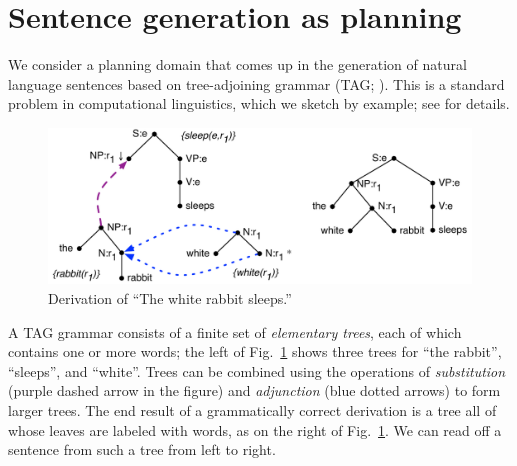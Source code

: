 \section{Sentence generation as planning}
\label{sec:crisp}


We consider a planning domain that comes up in the generation of
natural language sentences based on tree-adjoining grammar (TAG;
\cite{joshi;etal1997}).  This is a standard problem in computational
linguistics, which we sketch by example; see
\cite{Stone2003a,KolSto07} for details.


\begin{figure}
  \centering
  \includegraphics[width=1\columnwidth]{pic-derivation}
  \caption{Derivation of ``The white rabbit sleeps.''}
  \label{fig:white-rabbit-sleeps-deriv}
\end{figure}

A TAG grammar consists of a finite set of \emph{elementary trees},
each of which contains one or more words; the left of
Fig.~\ref{fig:white-rabbit-sleeps-deriv} shows three trees for ``the
rabbit'', ``sleeps'', and ``white''.  Trees can be combined using the
operations of \emph{substitution} (purple dashed arrow in the figure)
and \emph{adjunction} (blue dotted arrows) to form larger trees.
The end result of a grammatically correct derivation is a tree all of
whose leaves are labeled with words, as on the right of
Fig.~\ref{fig:white-rabbit-sleeps-deriv}. We can read off a sentence
from such a tree from left to right.

